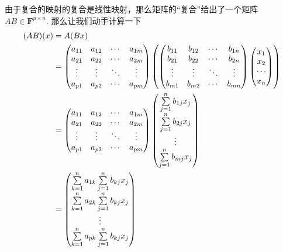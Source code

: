 由于复合的映射的复合是线性映射，那么矩阵的``复合''给出了一个矩阵 $AB\in\mathbf{F}^{p\times n}$. 那么让我们动手计算一下
\begin{align*}
    (AB)(x) &= A(Bx) \\
    &= \begin{pmatrix}
        a_{11} & a_{12} & \cdots & a_{1m} \\
        a_{21} & a_{22} & \cdots & a_{2m} \\
        \vdots & \vdots & \ddots & \vdots \\
        a_{p1} & a_{p2} & \cdots & a_{pm}
    \end{pmatrix} \left( \begin{pmatrix}
        b_{11} & b_{12} & \cdots & b_{1n} \\
        b_{21} & b_{22} & \cdots & b_{2n} \\
        \vdots & \vdots & \ddots & \vdots \\
        b_{m1} & b_{m2} & \cdots & b_{mn}
    \end{pmatrix} \begin{pmatrix}
        x_1 \\ x_2 \\ \cdots \\ x_n
    \end{pmatrix} \right)\\
    &= \begin{pmatrix}
        a_{11} & a_{12} & \cdots & a_{1m} \\
        a_{21} & a_{22} & \cdots & a_{2m} \\
        \vdots & \vdots & \ddots & \vdots \\
        a_{p1} & a_{p2} & \cdots & a_{pm}
    \end{pmatrix} \begin{pmatrix}
        \sum_{j=1}^n\limits b_{1j} x_j \\
        \sum_{j=1}^n\limits b_{2j} x_j \\
        \vdots \\
        \sum_{j=1}^n\limits b_{mj} x_j
    \end{pmatrix} \\
    &= \begin{pmatrix}
        \sum_{k=1}^n\limits a_{1k} \sum_{j=1}^n\limits b_{kj} x_j \\
        \sum_{k=1}^n\limits a_{2k} \sum_{j=1}^n\limits b_{kj} x_j \\
        \vdots \\
        \sum_{k=1}^n\limits a_{pk} \sum_{j=1}^n\limits b_{kj} x_j

\end{pmatrix}
\end{align*}

